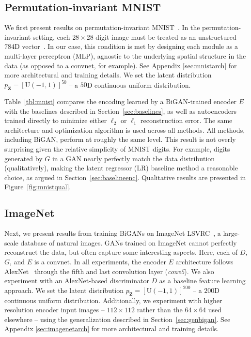 \documentclass{article}
\renewcommand{\vec}[1]{\mathbf{#1}}
\newcommand{\Z}{\vec{Z}}
\newcommand{\reffig}[1]{Figure~\ref{fig:#1}}
\newcommand{\refsec}[1]{Section~\ref{sec:#1}}
\newcommand{\reftbl}[1]{Table~\ref{tbl:#1}}
\newcommand{\lblsec}[1]{\label{sec:#1}}
\begin{document}
\subsection{Permutation-invariant MNIST}
\lblsec{evalmnist}
We first present results on permutation-invariant MNIST~\citep{mnist}.
In the permutation-invariant setting,
each $28\times28$ digit image must be treated as an unstructured $784$D vector~\citep{maxout}.
In our case, this condition is met by designing each module as a multi-layer perceptron (MLP),
agnostic to the underlying spatial structure in the data
(as opposed to a convnet, for example).
See Appendix \ref{sec:mnistarch} for more architectural and training details.
We set the latent distribution $p_\Z = \left[\mathrm{U}(-1, 1)\right]^{50}$ -- a $50$D continuous uniform distribution.

\reftbl{mnist} compares the encoding learned by a BiGAN-trained encoder $E$
with the baselines described in \refsec{baselines},
as well as autoencoders~\citep{hinton-autoencoders}
trained directly to minimize either
$\ell_2$ or $\ell_1$ reconstruction error.
The same architecture and optimization algorithm is used across all methods.
All methods, including BiGAN, perform at roughly the same level.
This result is not overly surprising given the relative simplicity of MNIST digits.
For example, digits generated by $G$ in a GAN nearly perfectly match the data distribution (qualitatively),
making the latent regressor (LR) baseline method a reasonable choice, as argued in \refsec{baselineenc}.
Qualitative results are presented in \reffig{mnistqual}.




\subsection{ImageNet}
\lblsec{evalimagenet}
Next, we present results from training BiGANs on ImageNet LSVRC~\citep{imagenet},
a large-scale database of natural images.
GANs trained on ImageNet cannot perfectly reconstruct the data, but often capture some interesting aspects.
Here, each of $D$, $G$, and $E$ is a convnet.
In all experiments, the encoder $E$ architecture follows AlexNet~\citep{supervision}
through the fifth and last convolution layer (\textit{conv5}).
We also experiment with an AlexNet-based discriminator $D$ as a baseline feature learning approach.
We set the latent distribution $p_\Z = \left[\mathrm{U}(-1, 1)\right]^{200}$
-- a $200$D continuous uniform distribution.
Additionally, we experiment with higher resolution encoder input images -- $112\times112$ rather than the $64\times64$ used elsewhere -- using the generalization described in Section~\ref{sec:genbigan}.
See Appendix \ref{sec:imagenetarch} for more architectural and training details.
\end{document}
